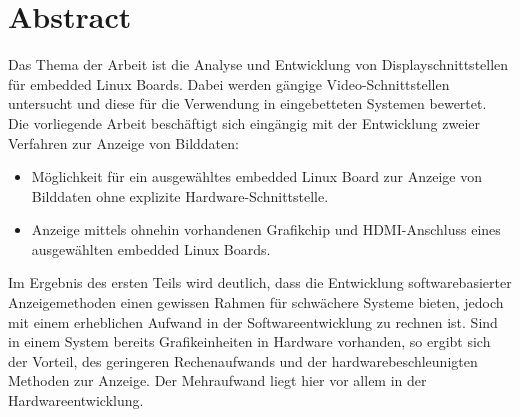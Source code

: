 \section*{Abstract}
\label{sec:Abstract}
Das Thema der Arbeit ist die Analyse und  Entwicklung von Displayschnittstellen für embedded Linux Boards. Dabei werden gängige Video-Schnittstellen untersucht und diese für die Verwendung in eingebetteten Systemen bewertet.\\
Die vorliegende Arbeit beschäftigt sich eingängig mit der Entwicklung zweier Verfahren zur Anzeige von Bilddaten:
\begin{itemize}
\item Möglichkeit für ein ausgewähltes embedded Linux Board zur Anzeige von Bilddaten ohne explizite Hardware-Schnittstelle.
\item Anzeige mittels ohnehin vorhandenen Grafikchip und HDMI-Anschluss eines ausgewählten embedded Linux Boards.
\end{itemize}
Im Ergebnis des ersten Teils wird deutlich, dass die Entwicklung softwarebasierter Anzeigemethoden einen gewissen Rahmen für schwächere Systeme bieten, jedoch mit einem erheblichen Aufwand in der Softwareentwicklung zu rechnen ist. Sind in einem System bereits Grafikeinheiten in Hardware vorhanden, so ergibt sich der Vorteil, des geringeren Rechenaufwands und der hardwarebeschleunigten Methoden zur Anzeige. Der Mehraufwand liegt hier vor allem in der Hardwareentwicklung.
